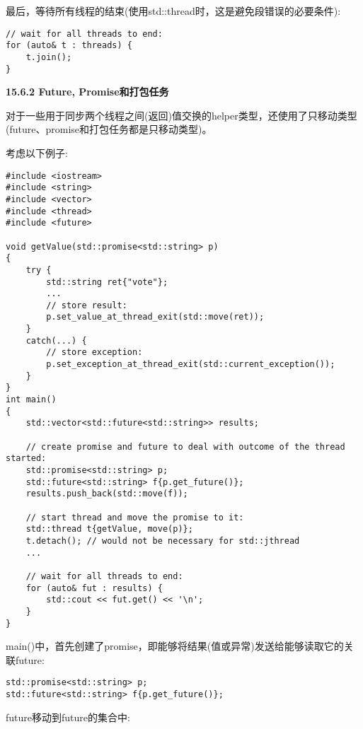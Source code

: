 最后，等待所有线程的结束(使用std::thread时，这是避免段错误的必要条件):\par

\begin{lstlisting}[caption={}]
// wait for all threads to end:
for (auto& t : threads) {
	t.join();
}
\end{lstlisting}

\hspace*{\fill} \par %
\textbf{15.6.2 Future, Promise和打包任务}

对于一些用于同步两个线程之间(返回)值交换的helper类型，还使用了只移动类型(future、promise和打包任务都是只移动类型)。\par

考虑以下例子:\par

{\color{red}{lib/future.cpp}}\par

\begin{lstlisting}[caption={}]
#include <iostream>
#include <string>
#include <vector>
#include <thread>
#include <future>

void getValue(std::promise<std::string> p)
{
	try {
		std::string ret{"vote"};
		...
		// store result:
		p.set_value_at_thread_exit(std::move(ret));
	}
	catch(...) {
		// store exception:
		p.set_exception_at_thread_exit(std::current_exception());
	}
}
int main()
{
	std::vector<std::future<std::string>> results;
	
	// create promise and future to deal with outcome of the thread started:
	std::promise<std::string> p;
	std::future<std::string> f{p.get_future()};
	results.push_back(std::move(f));
	
	// start thread and move the promise to it:
	std::thread t{getValue, move(p)};
	t.detach(); // would not be necessary for std::jthread
	...
	
	// wait for all threads to end:
	for (auto& fut : results) {
		std::cout << fut.get() << '\n';
	}
}
\end{lstlisting}

main()中，首先创建了promise，即能够将结果(值或异常)发送给能够读取它的关联future:\par

\begin{lstlisting}[caption={}]
std::promise<std::string> p;
std::future<std::string> f{p.get_future()};
\end{lstlisting}

future移动到future的集合中:\par

